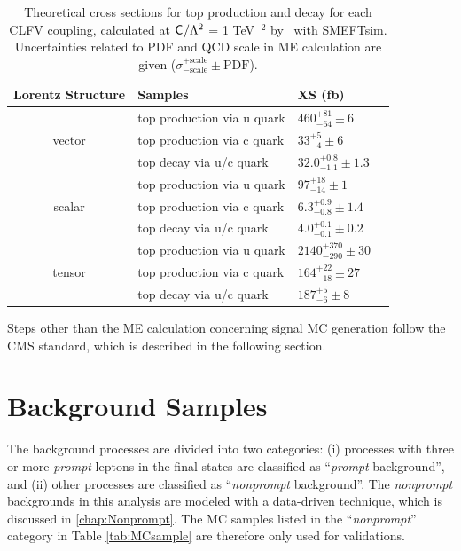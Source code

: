 \begin{table}[th]
\sffamily
\centering
\caption{Theoretical cross sections for top production and decay for each \ac{CLFV} coupling, calculated at $\textsf{C}^{}_{}/\mathrm{\Lambda}^2$ = 1 TeV$^{-2}$ by \MG~with SMEFTsim. Uncertainties related to \ac{PDF} and \ac{QCD} scale in \ac{ME} calculation are given ($\sigma^{+\text{scale}}_{-\text{scale}}\pm \text{PDF}$).}
\begin{tabular}{clll}
\toprule 
Lorentz Structure & Samples    & XS (fb) \\ \midrule
\multirow{3}{*}{vector} & top production via u quark & $460^{+81}_{-64}\pm6$ \\ 
  & top production via c quark & $33^{+5}_{-4}\pm6$ \\
  & top decay via u/c quark  & $32.0^{+0.8}_{-1.1}\pm1.3$ \\ \midrule
\multirow{3}{*}{scalar} &top production via u quark & $97^{+18}_{-14}\pm1$ \\ 
  & top production via c quark  & $6.3^{+0.9}_{-0.8}\pm1.4$ \\
  & top decay via u/c quark & $4.0^{+0.1}_{-0.1}\pm0.2$ \\ \midrule 
\multirow{3}{*}{tensor} & top production via u quark & $2140^{+370}_{-290}\pm30$ \\
  & top production via c quark & $164^{+22}_{-18}\pm27$ \\
  & top decay via u/c quark  & $187^{+5}_{-6}\pm8$ \\ \bottomrule
\end{tabular}
\vspace{-0.5em}
\label{tab:signal}
\end{table}

Steps other than the \ac{ME} calculation concerning signal \ac{MC} generation follow the \ac{CMS} standard, which is described in the following section.
\section{Background Samples}
\label{sec:Backgrounds}

The background processes are divided into two categories: (i) processes with three or more \emph{prompt} leptons in the final states are classified as ``\emph{prompt} background'', and (ii) other processes are classified as ``\emph{nonprompt} background''. The \emph{nonprompt} backgrounds in this analysis are modeled with a data-driven technique, which is discussed in \autoref{chap:Nonprompt}. The \ac{MC} samples listed in the ``\emph{nonprompt}'' category in Table \ref{tab:MCsample} are therefore only used for validations. 

